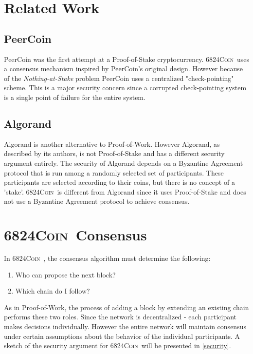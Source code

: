 \documentclass{article}
\newcommand{\coin}{ \textsc{6824Coin}\ }
\begin{document}
\section{Related Work}

\subsection{PeerCoin}
PeerCoin \cite{peercoin} was the first attempt at a Proof-of-Stake cryptocurrency. \coin uses a consensus mechanism inspired by PeerCoin's original design. However because of the \textit{Nothing-at-Stake} problem PeerCoin uses a centralized "check-pointing" scheme. This is a major security concern since a corrupted check-pointing system is a single point of failure for the entire system.  

\subsection{Algorand}
Algorand \cite{algorand} is another alternative to Proof-of-Work. However Algorand, as described by its authors, is not Proof-of-Stake and has a different security argument entirely. The security of Algorand depends on a Byzantine Agreement protocol that is run among a randomly selected set of participants. These participants are selected according to their coins, but there is no concept of a 'stake'. \coin is different from Algorand since it uses Proof-of-Stake and does not use a Byzantine Agreement protocol to achieve consensus.  

\section{\coin Consensus}

In \coin, the consensus algorithm must determine the following:
\begin{enumerate}
\item{Who can propose the next block?}
\item{Which chain do I follow?}
\end{enumerate}
As in Proof-of-Work, the process of adding a block by extending an existing chain performs these two roles. Since the network is decentralized - each participant makes decisions individually. However the entire network will maintain consensus under certain assumptions about the behavior of the individual participants. A sketch of the security argument for \coin will be presented in \ref{security}.
\end{document}
